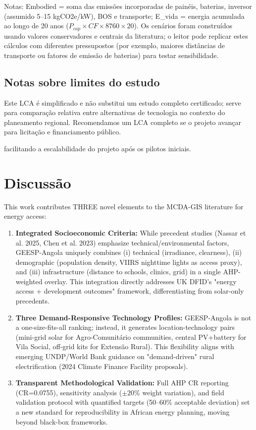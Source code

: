 \documentclass[12pt, a4paper]{article}
\begin{document}
\noindent Notas: Embodied = soma das emissões incorporadas de painéis, baterias, inversor (assumido 5--15 kgCO2e/kW), BOS e transporte; E\_vida = energia acumulada ao longo de 20 anos ($P_{cap}\times CF\times 8760\times 20$). Os cenários foram construídos usando valores conservadores e centrais da literatura; o leitor pode replicar estes cálculos com diferentes pressupostos (por exemplo, maiores distâncias de transporte ou fatores de emissão de baterias) para testar sensibilidade.

\subsection{Notas sobre limites do estudo}
Este LCA é simplificado e não substitui um estudo completo certificado; serve para
comparação relativa entre alternativas de tecnologia no contexto do planeamento regional.
Recomendamos um LCA completo se o projeto avançar para licitação e financiamento público.

facilitando a escalabilidade do projeto após os pilotos iniciais.

\section{Discussão}
This work contributes THREE novel elements to the MCDA-GIS literature for energy access:

\begin{enumerate}
  \item \textbf{Integrated Socioeconomic Criteria:} While precedent studies (Nassar et al. 2025, Chen et al. 2023) emphasize technical/environmental factors, GEESP-Angola uniquely combines (i) technical (irradiance, clearness), (ii) demographic (population density, VIIRS nighttime lights as access proxy), and (iii) infrastructure (distance to schools, clinics, grid) in a single AHP-weighted overlay. This integration directly addresses UK DFID's "energy access + development outcomes" framework, differentiating from solar-only precedents.
  \item \textbf{Three Demand-Responsive Technology Profiles:} GEESP-Angola is not a one-size-fits-all ranking; instead, it generates location-technology pairs (mini-grid solar for Agro-Comunitário communities, central PV+battery for Vila Social, off-grid kits for Extensão Rural). This flexibility aligns with emerging UNDP/World Bank guidance on "demand-driven" rural electrification (2024 Climate Finance Facility proposals).
  \item \textbf{Transparent Methodological Validation:} Full AHP CR reporting (CR=0.0755), sensitivity analysis ($\pm 20\%$ weight variation), and field validation protocol with quantified targets (50--60\% acceptable deviation) set a new standard for reproducibility in African energy planning, moving beyond black-box frameworks.
\end{enumerate}
\end{document}
